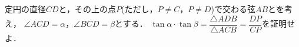 \documentclass[../../main.tex]{subfiles}
\begin{document}
定円の直径$CD$と，その上の点$P$(ただし，$P \neq C$，$P \neq D$)で交わる弦$AB$とを考え，
$\angle ACD=\alpha$，$\angle BCD=\beta$とする．
$\displaystyle\tan\alpha\cdot\tan\beta=\dfrac{\triangle ADB}{\triangle ACB}=\dfrac{DP}{CP}$を証明せよ．
\end{document}
